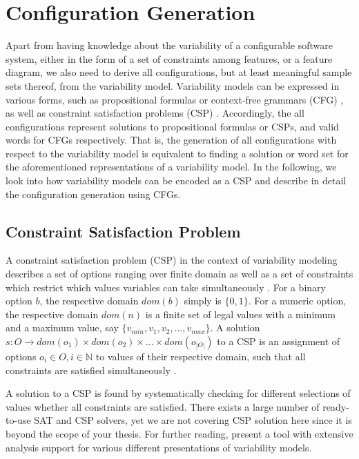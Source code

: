 \section{Configuration Generation}\label{sec:configuration_gen}
Apart from having knowledge about the variability of a configurable software
system, either in the form of a set of constraints among features, or a feature
diagram, we also need to derive all configurations, but at least meaningful
sample sets thereof, from the variability model. Variability models can be
expressed in various forms, such as propositional formulas or context-free
grammars (CFG) \citep{batory_feature_2005}, as well as constraint satisfaction
problems (CSP) \citep{benavides_automated_2005,benavides_using_2005}.
Accordingly, the all configurations represent solutions to propositional formulas or CSPs, and valid words for CFGs
respectively. That is, the generation of all configurations with respect to the
variability model is equivalent to finding a solution or word set for the
aforementioned representations of a variability model. In the following, we
look into how variability models can be encoded as a CSP and describe in detail
the configuration generation using CFGs.

\subsection{Constraint Satisfaction Problem}
A constraint satisfaction problem (CSP) in the context of variability modeling
describes a set of options ranging over finite domain as well as a set of
constraints which restrict which values variables can take simultaneously
\citep{benavides_automated_2005}. For a binary option $b$, the respective domain
$dom(b)$ simply is $\lbrace 0, 1\rbrace$.
For a numeric option, the respective domain $dom(n)$ is a finite set of legal
values with a minimum and a maximum value, say $\lbrace v_{min}, v_1,
v_2, \ldots, v_{max}\rbrace$.
A solution $s: O \rightarrow dom(o_1) \times dom(o_2) \times \ldots \times
dom(o_{|O|})$ to a CSP is an assignment of options $o_i \in O, i \in \mathbb{N}$
to values of their respective domain, such that all constraints are satisfied simultaneously \citep{benavides_automated_2005}.  

A solution to a CSP is found by systematically checking for different
selections of values whether all constraints are satisfied. There exists a
large number of ready-to-use SAT and CSP solvers, yet we are not covering CSP
solution here since it is beyond the scope of your thesis. For further reading, 
\citep{benavides_fama:_2007} present a tool with extensive analysis support for
various different presentations of variability models.

